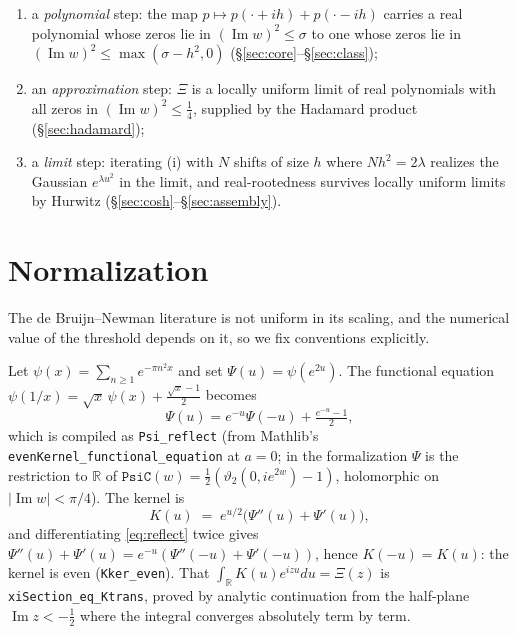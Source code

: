 \documentclass[11pt]{article}
\theoremstyle{definition}
\DeclareMathOperator{\Imop}{Im}
\begin{document}
\begin{enumerate}
\item[(i)] a \emph{polynomial} step: the map $p\mapsto p(\cdot+ih)+p(\cdot-ih)$ carries a real
  polynomial whose zeros lie in $(\Imop w)^{2}\le\sigma$ to one whose zeros lie in
  $(\Imop w)^{2}\le\max(\sigma-h^{2},0)$ (\S\ref{sec:core}--\S\ref{sec:class});
\item[(ii)] an \emph{approximation} step: $\Xi$ is a locally uniform limit of real polynomials with all
  zeros in $(\Imop w)^{2}\le\tfrac14$, supplied by the Hadamard product (\S\ref{sec:hadamard});
\item[(iii)] a \emph{limit} step: iterating (i) with $N$ shifts of size $h$ where $Nh^{2}=2\lambda$
  realizes the Gaussian $e^{\lambda u^{2}}$ in the limit, and real-rootedness survives locally uniform
  limits by Hurwitz (\S\ref{sec:cosh}--\S\ref{sec:assembly}).
\end{enumerate}

\section{Normalization}\label{sec:normal}

The de Bruijn--Newman literature is not uniform in its scaling, and the numerical value of the
threshold depends on it, so we fix conventions explicitly.

Let $\psi(x)=\sum_{n\ge1}e^{-\pi n^{2}x}$ and set $\Psi(u)=\psi(e^{2u})$.  The functional equation
$\psi(1/x)=\sqrt{x}\,\psi(x)+\tfrac{\sqrt x-1}{2}$ becomes
\begin{equation}\label{eq:reflect}
  \Psi(u)=e^{-u}\Psi(-u)+\tfrac{e^{-u}-1}{2},
\end{equation}
which is compiled as \texttt{Psi\_reflect} (from Mathlib's \texttt{evenKernel\_functional\_equation}
at $a=0$; in the formalization $\Psi$ is the restriction to $\mathbb R$ of
$\texttt{PsiC}(w)=\tfrac12(\vartheta_2(0,ie^{2w})-1)$, holomorphic on $|\Imop w|<\pi/4$).  The kernel is
\[
  K(u)\;=\;e^{u/2}\bigl(\Psi''(u)+\Psi'(u)\bigr),
\]
and differentiating \eqref{eq:reflect} twice gives $\Psi''(u)+\Psi'(u)=e^{-u}(\Psi''(-u)+\Psi'(-u))$,
hence $K(-u)=K(u)$: the kernel is even (\texttt{Kker\_even}).  That $\int_{\mathbb R}K(u)e^{izu}du=\Xi(z)$
is \texttt{xiSection\_eq\_Ktrans}, proved by analytic continuation from the half-plane
$\Imop z<-\tfrac12$ where the integral converges absolutely term by term.
\end{document}
